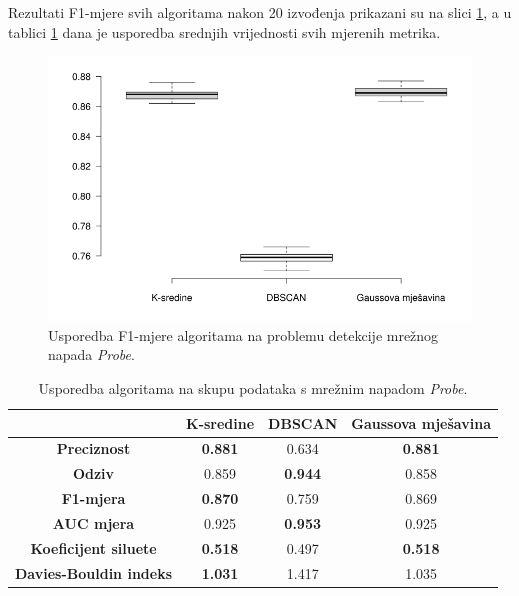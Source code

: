 \documentclass[utf8, diplomski, numeric]{fer}
\begin{document}
Rezultati F1-mjere svih algoritama nakon 20 izvođenja prikazani su na slici \ref{fig:probe-f1}, a u tablici \ref{tab:probe} dana je usporedba srednjih vrijednosti svih mjerenih metrika. 

\begin{figure}[h!]
\includegraphics[width=1\textwidth]{images/probe-f1.png}
\centering
\caption{Usporedba F1-mjere algoritama na problemu detekcije mrežnog napada \textit{Probe}.}
\label{fig:probe-f1}
\end{figure}

\begin{table}[h!]
  \begin{center}
    \caption{Usporedba algoritama na skupu podataka s mrežnim napadom \textit{Probe}.}
    \label{tab:probe}
    \begin{tabular}{c|c|c|c} 
      & \textbf{K-sredine} & \textbf{DBSCAN}  & \textbf{Gaussova mješavina}\\
      \hline
      \textbf{Preciznost} & \textbf{0.881} & 0.634 & \textbf{0.881} \\
      \textbf{Odziv} & 0.859 & \textbf{0.944} & 0.858 \\
      \textbf{F1-mjera} & \textbf{0.870} & 0.759 & 0.869 \\
      \textbf{AUC mjera} & 0.925 & \textbf{0.953} & 0.925 \\
       \textbf{Koeficijent siluete} & \textbf{0.518} & 0.497 & \textbf{0.518} \\
       \textbf{Davies-Bouldin indeks} & \textbf{1.031} & 1.417 & 1.035 \\
     \end{tabular}
  \end{center}
\end{table}
\end{document}
